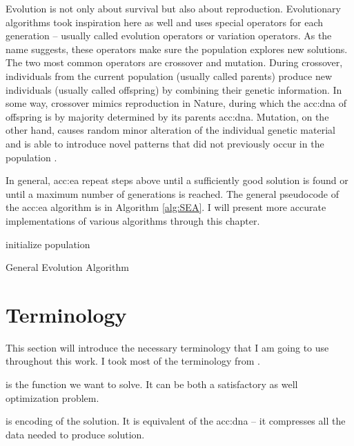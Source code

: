 Evolution is not only about survival but also about reproduction. Evolutionary algorithms took inspiration here as well and uses special operators for each generation -- usually called evolution operators or variation operators. As the name suggests, these operators make sure the population explores new solutions. The two most common operators are crossover and mutation. During crossover, individuals from the current population (usually called parents) produce new individuals (usually called offspring) by combining their genetic information. In some way, crossover mimics reproduction in Nature, during which the \acrshort{acc:dna} of offspring is by majority determined by its parents \acrshort{acc:dna}. Mutation, on the other hand, causes random minor alteration of the individual genetic material and is able to introduce novel patterns that did not previously occur in the population \citep{HowToSolveItModernHeuristics}.

In general, \acrshort{acc:ea} repeat steps above until a sufficiently good solution is found or until a maximum number of generations is reached. The general pseudocode of the \acrshort{acc:ea} algorithm is in Algorithm \ref{alg:SEA}. I will present more accurate implementations of various algorithms through this chapter.

\begin{algorithm}
    \SetAlgoLined
    initialize population\;
    \caption{General Evolution Algorithm}
    \label{alg:SEA}
\end{algorithm}




\section{Terminology}

This section will introduce the necessary terminology that I am going to use throughout this work. I took most of the terminology from \citet{IntroductionToEA}.

 is the function we want to solve. It can be both a satisfactory as well optimization problem.

 is encoding of the solution. It is equivalent of the \acrshort{acc:dna} -- it compresses all the data needed to produce solution.

